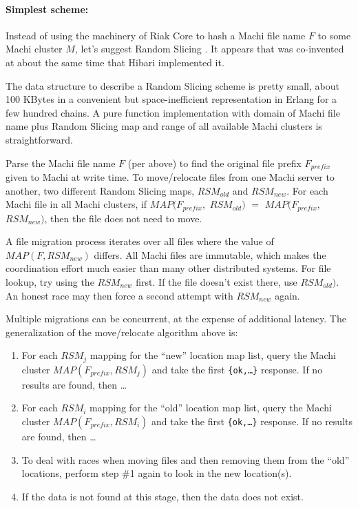 \documentclass[preprint,10pt]{sigplanconf}
\begin{document}
\paragraph{Simplest scheme:}
Instead of using the machinery of Riak Core to hash a Machi file name
$F$ to some Machi cluster $M$, let's suggest Random Slicing
\cite{random-slicing}.  It appears that \cite{random-slicing} was
co-invented at about the same time that Hibari
\cite{cr-theory-and-practice} implemented it.

The data structure to describe a Random Slicing scheme is pretty
small, about 100 KBytes in a convenient but space-inefficient
representation in Erlang for a few hundred chains.
A pure function implementation with domain of Machi file
name plus Random Slicing map and range of all available Machi clusters
is straightforward.

Parse the Machi file name $F$ (per above) to find the original
file prefix $F_{prefix}$ given to Machi at write time.
To move/relocate files from one Machi server to another, two different
Random Slicing maps, $RSM_{old}$ and $RSM_{new}$.  For each Machi file
in all Machi clusters, if
$MAP(F_{prefix},$ $RSM_{old})$ $=$ $MAP(F_{prefix},$ $RSM_{new})$,
then the file does not need to move.

A file migration process iterates over all files where the value of
$MAP(F, RSM_{new})$ differs.  All Machi files are immutable, which
makes the coordination effort much easier than many other distributed
systems.  For file lookup, try using the $RSM_{new}$ first.  If the
file doesn't exist there, use $RSM_{old})$.  An honest race may
then force a second attempt with $RSM_{new}$ again.

Multiple migrations can be concurrent, at the expense of additional
latency.  The generalization of the move/relocate algorithm above is:

\begin{enumerate}
\item For each $RSM_j$ mapping for the ``new'' location map list,
  query the Machi cluster $MAP(F_{prefix}, RSM_j)$ and take the
  first {\tt \{ok,\ldots\}} response.  If no results are found, then \ldots
\item For each $RSM_i$ mapping for the ``old'' location map list,
  query the Machi cluster $MAP(F_{prefix}, RSM_i)$ and take the
  first {\tt \{ok,\ldots\}} response.  If no results are found, then \ldots
\item To deal with races when moving files and then removing them from
  the ``old'' locations, perform step \#1 again to look in the new
  location(s).
\item If the data is not found at this stage, then the data does not exist.
\end{enumerate}
\end{document}
